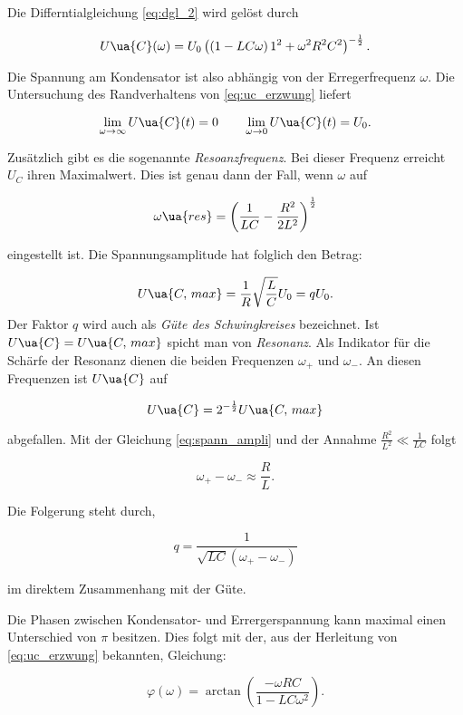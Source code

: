 Die Differntialgleichung \eqref{eq:dgl_2} wird gelöst durch

\begin{equation}
  \label{eq:uc_erzwung}
  U\ua{C}(\omega)=U_0\left(\left(1-LC\omega\right)1^2+\omega^2R^2C^2\right)^{-\frac{1}{2}}.
\end{equation}

Die Spannung am Kondensator ist also abhängig von der Erregerfrequenz $\omega$.
Die Untersuchung des Randverhaltens von \eqref{eq:uc_erzwung} liefert

\begin{equation*}
  \lim_{\omega \to \infty} U\ua{C}(t)=0 \qquad \lim_{\omega \to 0} U\ua{C}(t)=U_0.
\end{equation*}

Zusätzlich gibt es die sogenannte \emph{Resoanzfrequenz}.
Bei dieser Frequenz erreicht $U_C$ ihren Maximalwert. Dies ist genau dann der Fall, wenn
$\omega$ auf

\begin{equation*}
  \label{eq:resonanzfrequenz}
  \omega\ua{res}=\left(\frac{1}{LC}-\frac{R^2}{2L^2}\right)^{\frac{1}{2}}
\end{equation*}

eingestellt ist.
Die Spannungsamplitude hat folglich den Betrag:

\begin{equation}
  \label{eq:spann_ampli}
  U\ua{C,\, max}=\frac{1}{R}\sqrt{\frac{L}{C}}U_0=qU_0.
\end{equation}
Der Faktor $q$ wird auch als \emph{Güte des Schwingkreises} bezeichnet.
Ist $U\ua{C}=U\ua{C,\, max}$ spicht man von \emph{Resonanz}.
Als Indikator für die Schärfe der Resonanz dienen die beiden
Frequenzen $\omega_+$ und $\omega_-$. An diesen Frequenzen ist
$U\ua{C}$ auf

\begin{equation*}
   U\ua{C}=2^{-\frac{1}{2}} U\ua{C,\, max}
\end{equation*}

abgefallen.
Mit der Gleichung \eqref{eq:spann_ampli} und der Annahme $\frac{R^2}{L^2}\ll \frac{1}{LC}$
folgt

\begin{equation}
  \label{eq:omega_+_-}
  \omega_+-\omega_-\approx \frac{R}{L}.
\end{equation}

Die Folgerung steht durch,

\begin{equation*}
  q=\frac{1}{\sqrt{LC}\left(\omega_+-\omega_-\right)}
\end{equation*}

im direktem Zusammenhang mit der Güte.

Die Phasen zwischen Kondensator- und Errergerspannung kann maximal
einen Unterschied von $\pi$ besitzen. Dies folgt mit der, aus der
Herleitung von \eqref{eq:uc_erzwung} bekannten, Gleichung:

\begin{equation}
  \label{eq:phase}
  \varphi(\omega)=\arctan\left(\frac{-\omega RC}{1-LC\omega^2}\right).
\end{equation}
